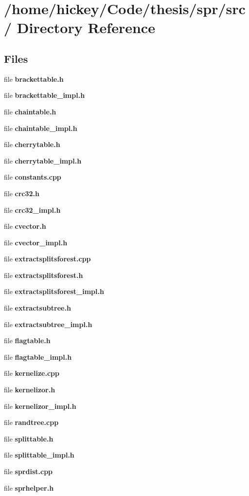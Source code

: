 \section{/home/hickey/Code/thesis/spr/src/ Directory Reference}
\label{dir_000000}
\subsection*{Files}
\begin{CompactItemize}
\item 
file {\bf brackettable.h}
\item 
file {\bf brackettable\_\-impl.h}
\item 
file {\bf chaintable.h}
\item 
file {\bf chaintable\_\-impl.h}
\item 
file {\bf cherrytable.h}
\item 
file {\bf cherrytable\_\-impl.h}
\item 
file {\bf constants.cpp}
\item 
file {\bf crc32.h}
\item 
file {\bf crc32\_\-impl.h}
\item 
file {\bf cvector.h}
\item 
file {\bf cvector\_\-impl.h}
\item 
file {\bf extractsplitsforest.cpp}
\item 
file {\bf extractsplitsforest.h}
\item 
file {\bf extractsplitsforest\_\-impl.h}
\item 
file {\bf extractsubtree.h}
\item 
file {\bf extractsubtree\_\-impl.h}
\item 
file {\bf flagtable.h}
\item 
file {\bf flagtable\_\-impl.h}
\item 
file {\bf kernelize.cpp}
\item 
file {\bf kernelizor.h}
\item 
file {\bf kernelizor\_\-impl.h}
\item 
file {\bf randtree.cpp}
\item 
file {\bf splittable.h}
\item 
file {\bf splittable\_\-impl.h}
\item 
file {\bf sprdist.cpp}
\item 
file {\bf sprhelper.h}
\item 

\end{CompactItemize}

